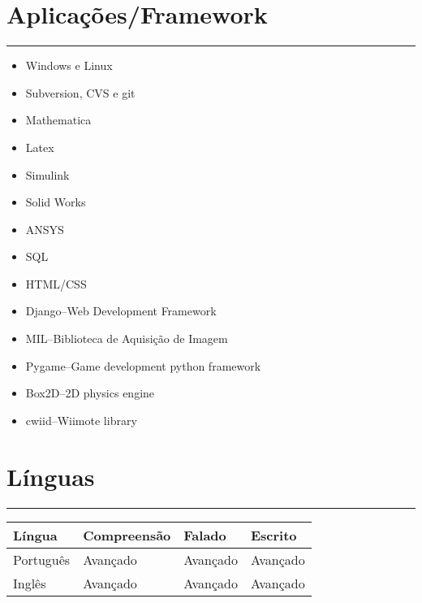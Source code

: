 \documentclass[a4paper,portuguese]{article}
\newcommand{\topic}[1]{
\section*{#1} \vspace{-6mm}
\rule{\columnwidth}{.25mm}
}
\begin{document}
\topic{Aplicações/Framework}
\begin{itemize}
\setlength{\itemsep}{-1mm}
    \item Windows e Linux
    \item Subversion, CVS e git
    \item Mathematica
    \item Latex
    \item Simulink
    \item Solid Works
    \item ANSYS
    \item SQL
    \item HTML/CSS
    \item Django--Web Development Framework
    \item MIL--Biblioteca de Aquisição de Imagem
    \item Pygame--Game development python framework
    \item Box2D--2D physics engine
    \item cwiid--Wiimote library
\end{itemize}

\topic{Línguas}

\begin{tabular}{llll}
Língua & Compreensão & Falado & Escrito \\
\hline
Português & Avançado & Avançado & Avançado \\
Inglês & Avançado & Avançado & Avançado \\
\end{tabular}
\end{document}
